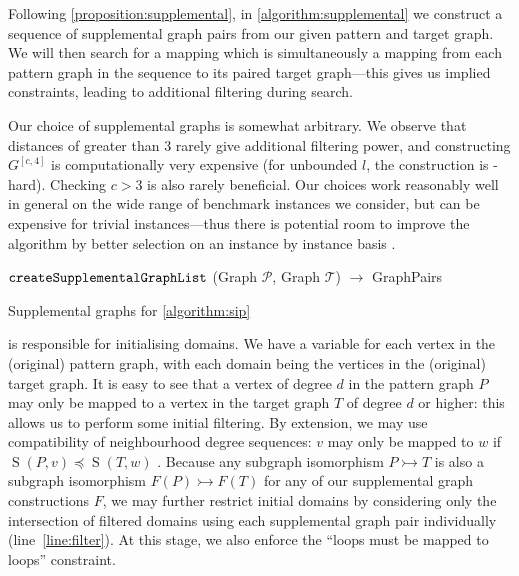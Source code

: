 \documentclass{llncs}
\newcommand{\lineref}[1]{line~\ref{#1}}
\begin{document}
Following \cref{proposition:supplemental}, in \cref{algorithm:supplemental} we construct a sequence
of supplemental graph pairs from our given pattern and target graph. We will then search for a
mapping which is simultaneously a mapping from each pattern graph in the sequence to its paired
target graph---this gives us implied constraints, leading to additional filtering during search.

Our choice of supplemental graphs is somewhat arbitrary. We observe that distances of greater than 3
rarely give additional filtering power, and constructing $G^{\left[c, 4\right]}$ is computationally
very expensive (for unbounded $l$, the construction is \NP-hard). Checking $c > 3$ is also rarely
beneficial. Our choices work reasonably well in general on the wide range of benchmark instances we
consider, but can be expensive for trivial instances---thus there is potential room to improve the
algorithm by better selection on an instance by instance basis \cite{Malitsky:2014}.

\begin{algorithm}[t]
\DontPrintSemicolon
\nl $\FuncSty{createSupplementalGraphList}$ (Graph $\mathcal{P}$, Graph $\mathcal{T}$) $\rightarrow$ GraphPairs \;
\nl {}
\caption{Supplemental graphs for \cref{algorithm:sip}}
\label{algorithm:supplemental}
\end{algorithm}

 is responsible for initialising domains. We have a variable for each vertex in
the (original) pattern graph, with each domain being the vertices in the (original) target graph. It
is easy to see that a vertex of degree $d$ in the pattern graph $P$ may only be mapped to a vertex in
the target graph $T$ of degree $d$ or higher: this allows us to perform some initial filtering. By
extension, we may use compatibility of neighbourhood degree sequences: $v$ may only be mapped to $w$
if $\operatorname{S}(P, v) \preceq \operatorname{S}(T, w)$ \cite{Zampelli:2010}.  Because any
subgraph isomorphism $P \rightarrowtail T$ is also a subgraph isomorphism $F(P) \rightarrowtail
F(T)$ for any of our supplemental graph constructions $F$, we may further restrict initial domains
by considering only the intersection of filtered domains using each supplemental graph pair
individually (\lineref{line:filter}). At this stage, we also enforce the ``loops must be mapped to loops'' constraint.
\end{document}
